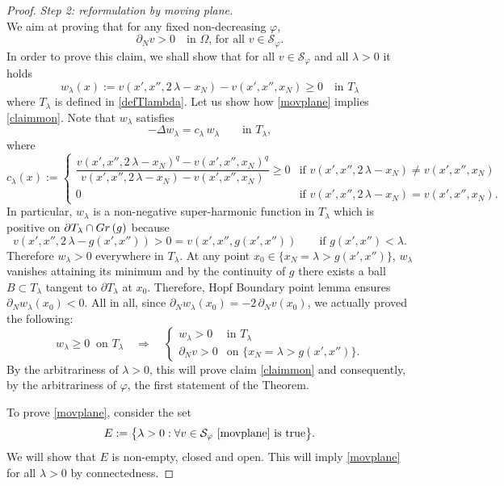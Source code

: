 \documentclass[12pt]{amsart}
\numberwithin{equation}{section}
\theoremstyle{plain}
\theoremstyle{plain}
\theoremstyle{plain}
\theoremstyle{definition}
\newcommand{\beq}{\begin{equation}}
\newcommand{\eeq}{\end{equation}}
\renewcommand{\ge}{\geqslant}
\newcommand{\cal}{\mathcal}
\begin{document}
\begin{proof}
\smallskip
{\em Step 2: reformulation by moving plane.}\\
 We aim at proving that for any fixed non-decreasing $\varphi$, 
 \beq
 \label{claimmon}
 \partial_N v>0 \quad \text{in $\Omega$, for all $v\in {\cal S}_{\varphi}$}.
 \eeq
 In order to prove this claim, we shall show that for all $v\in {\cal S}_{\varphi}$ and all $\lambda>0$ it holds
\beq
\label{movplane}
w_\lambda(x):=v(x',x'', 2\, \lambda-x_N)- v(x', x'', x_N)\ge 0\quad \text{in } T_{\lambda} 
\eeq
where $T_\lambda$ is defined in \eqref{defTlambda}.
Let us show how \eqref{movplane} implies \eqref{claimmon}. Note that $w_\lambda$ satisfies
\beq
\label{eqwlambda}
-\Delta w_\lambda= c_\lambda\, w_\lambda\qquad \text{in $T_{\lambda}$},
\eeq
where 
\beq
\label{defc}
 c_\lambda(x) :=
 \begin{cases}
 \dfrac{v(x',x'', 2\, \lambda-x_N)^q- v(x', x'', x_N)^q}{v(x', x'', 2\, \lambda-x_N)- v(x', x'', x_N)} \ge 0&\text{if $v(x', x'', 2\, \lambda-x_N)\ne v(x', x'', x_N)$}\\[5pt]
 0&\text{if $v(x', x'', 2\, \lambda-x_N)=v(x', x'', x_N)$}.
 \end{cases}
 \eeq
In particular, $w_{\lambda}$ is a non-negative super-harmonic function in $T_{\lambda}$ which is positive on $\partial T_{\lambda}\cap {\rm Gr}\, (g)$ because 
\[
v(x', x'', 2\, \lambda-g(x', x''))>0=v(x', x'', g(x', x'')) \qquad \text{if $g(x', x'')<\lambda$}.
\]
Therefore $w_\lambda>0$ everywhere in $T_{\lambda}$. 
At any point $x_0\in \{x_N=\lambda>g(x', x'')\}$, $w_\lambda$ vanishes attaining its minimum and by the continuity of $g$ there exists a ball $B\subset T_{\lambda}$ tangent to $\partial T_{\lambda}$ at $x_0$. 
Therefore, Hopf Boundary point lemma ensures $\partial_N w_\lambda(x_0)<0$. All in all, since $\partial_N w_\lambda(x_0)=-2\, \partial_N v(x_0)$, we actually proved the following:
\beq
\label{hopfc}
w_\lambda\ge 0\ \text{ on $T_{\lambda}$}\quad \Longrightarrow\quad 
\begin{cases}
 w_\lambda>0&\text{in $T_{\lambda}$}\\
 \partial_N v>0&\text{on $\{x_N=\lambda>g(x', x'')\}$}.
 \end{cases}
 \eeq
By the arbitrariness of $\lambda>0$, this will prove claim \eqref{claimmon} and consequently, by the arbitrariness of $\varphi$, the first statement of the Theorem.

To prove \eqref{movplane}, consider the set 
\[
E:=\big\{\lambda>0 :\forall v \in {\cal S}_{\varphi}\text{ \eqref{movplane} is true}\big\}.
\]
We will show that $E$ is non-empty, closed and open. This will imply \eqref{movplane} for all $\lambda>0$ by connectedness. 


\end{proof}
\end{document}
